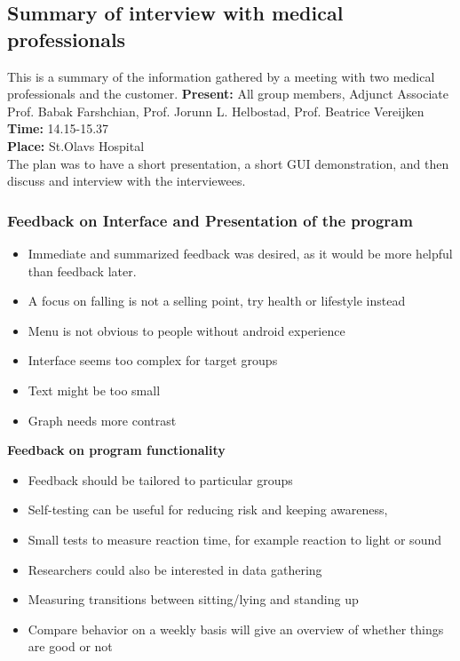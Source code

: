 \subsection{Summary of interview with medical professionals}
This is a summary of the information gathered by a meeting with two medical professionals and the customer.
\textbf{Present:} All group members, Adjunct Associate Prof. Babak Farshchian, Prof. Jorunn L. Helbostad, Prof. Beatrice Vereijken \\
\textbf{Time:} 14.15-15.37\\
\textbf{Place:} St.Olavs Hospital\\
The plan was to have a short presentation, a short GUI demonstration, and then discuss and interview with the interviewees. \\
\subsubsection*{Feedback on Interface and Presentation of the program}
\begin{itemize}
\item Immediate and summarized feedback was desired, as it would be more helpful than feedback later.
\item A focus on falling is not a selling point, try health or lifestyle instead
\item Menu is not obvious to people without android experience
\item Interface seems too complex for target groups
\item Text might be too small
\item Graph needs more contrast 

\end{itemize}

\textbf{Feedback on program functionality}
\begin{itemize}
\item Feedback should be tailored to particular groups
\item Self-testing can be useful for reducing risk and keeping awareness,
\item Small tests to measure reaction time, for example reaction to light or sound
\item Researchers could also be interested in data gathering
\item Measuring transitions between sitting/lying and standing up
\item Compare behavior on a weekly basis will give an overview of whether things are good or not
\end{itemize}

